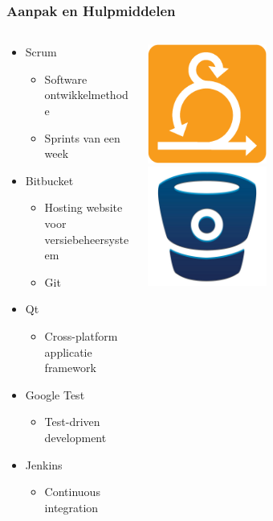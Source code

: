 \begin{frame}\frametitle{Aanpak en Hulpmiddelen}
	\begin{columns}[T]
  		\begin{column}{.7\textwidth}
			\begin{itemize}
				\item Scrum
					\begin{itemize}
						\item Software ontwikkelmethode
						\item Sprints van een week
					\end{itemize}
				\item Bitbucket
					\begin{itemize}
						\item Hosting website voor versiebeheersysteem
						\item Git
					\end{itemize}
				\item Qt
					\begin{itemize}
						\item Cross-platform applicatie framework
					\end{itemize}
				\item Google Test
					\begin{itemize}
						\item Test-driven development
					\end{itemize}
				\item Jenkins
					\begin{itemize}
						\item Continuous integration
					\end{itemize}
			\end{itemize}
		\end{column}
		\begin{column}{.3\textwidth}
			\includegraphics[width=0.45\textwidth]{images/scrum.png}\\
			\includegraphics[width=0.45\textwidth]{images/bitbucket.jpg}\\

\end{column}
\end{columns}
\end{frame}

